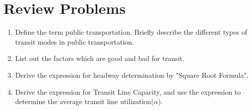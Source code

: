 \section{Review Problems}
\begin{enumerate}
	\item Define the term public transportation. Briefly describe the different types of transit modes in public transportation.
	\item List out the factors which are good and bad for transit.
	\item Derive the expression for headway determination by "Square Root Formula".
	\item Derive the expression for Transit Line Capacity, and use the expression to determine the average transit line utilization($\alpha$).
\end{enumerate}